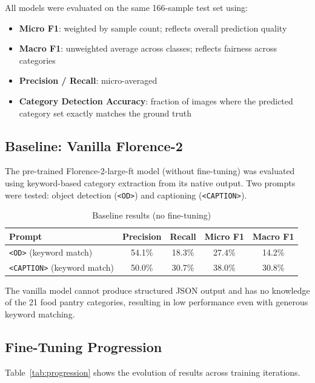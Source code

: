 \documentclass[11pt]{article}
\begin{document}
All models were evaluated on the same 166-sample test set using:
\begin{itemize}[nosep]
\item \textbf{Micro F1}: weighted by sample count; reflects overall prediction quality
\item \textbf{Macro F1}: unweighted average across classes; reflects fairness across categories
\item \textbf{Precision / Recall}: micro-averaged
\item \textbf{Category Detection Accuracy}: fraction of images where the predicted category set exactly matches the ground truth
\end{itemize}

\subsection{Baseline: Vanilla Florence-2}

The pre-trained Florence-2-large-ft model (without fine-tuning) was evaluated using keyword-based category extraction from its native output. Two prompts were tested: object detection (\texttt{<OD>}) and captioning (\texttt{<CAPTION>}).

\begin{table}[h]
\centering
\caption{Baseline results (no fine-tuning)}
\begin{tabular}{lcccc}
\toprule
Prompt & Precision & Recall & Micro F1 & Macro F1 \\
\midrule
\texttt{<OD>} (keyword match) & 54.1\% & 18.3\% & 27.4\% & 14.2\% \\
\texttt{<CAPTION>} (keyword match) & 50.0\% & 30.7\% & 38.0\% & 30.8\% \\
\bottomrule
\end{tabular}
\end{table}

The vanilla model cannot produce structured JSON output and has no knowledge of the 21 food pantry categories, resulting in low performance even with generous keyword matching.

\subsection{Fine-Tuning Progression}

Table~\ref{tab:progression} shows the evolution of results across training iterations.
\end{document}

